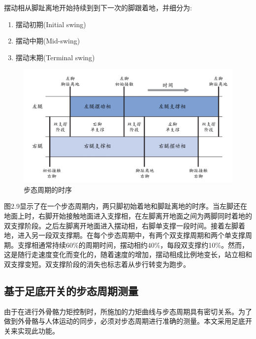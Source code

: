 摆动相从脚趾离地开始持续到到下一次的脚跟着地，并细分为:
\begin{enumerate}
    \item 摆动初期(Initial swing)
    \item 摆动中期(Mid-swing)
    \item 摆动末期(Terminal swing)
\end{enumerate}

\begin{figure}[htb]
    \includegraphics[width=15cm]{fig/f30.jpg}
    \caption{步态周期的时序}
    \label{fig:mark}
\end{figure}

图2.9显示了在一个步态周期内，两只脚初始着地和脚趾离地的时序。当左脚还在地面上时，右脚开始接触地面进入支撑相，在左脚离开地面之间为两脚同时着地的双支撑阶段。之后左脚离开地面进入摆动相，右脚单支撑一段时间。接着左脚着地，进入另一段双支撑期。在每个步态周期中，有两个双支撑周期和两个单支撑周期。支撑相通常持续60\%的周期时间，摆动相约40\%，每段双支撑约10\%。然而，这是随行走速度变化而变化的，随着速度的增加，摆动相成比例地变长，站立相和双支撑变短。双支撑阶段的消失也标志着从步行转变为跑步。

\subsection{基于足底开关的步态周期测量}

由于在进行外骨骼力矩控制时，所施加的力矩曲线与步态周期具有密切关系。为了做到外骨骼与人体运动的同步，必须对步态周期进行准确的测量。本文采用足底开关来实现此功能。

